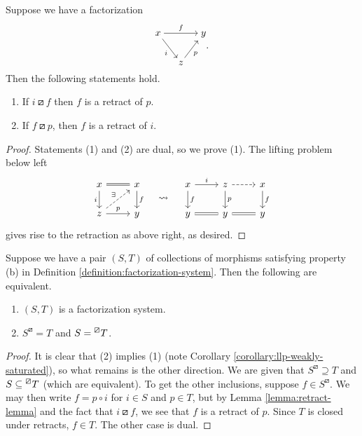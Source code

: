 \begin{lemma}\label{lemma:retract-lemma}
	Suppose we have a factorization
	\[
	\begin{tikzcd}[cramped, column sep=small]
		x\ar[rr,"f"]\ar[dr,"i"'] & & y \\
		& z\ar[ur,"p"'] &
	\end{tikzcd}.
	\]
	Then the following statements hold.
	\begin{enumerate}[label=(\arabic*)]
		\item If \(i\boxslash f\) then \(f\) is a retract of \(p\).
		\item If \(f\boxslash p\), then \(f\) is a retract of \(i\).
	\end{enumerate}
\end{lemma}
\begin{proof}
Statements (1) and (2) are dual, so we prove (1). The lifting problem below left
\[
	\begin{tikzcd}
		x\ar[r,equal]\ar[d,"i"'] & x \ar[d,"f"] \\
		z\ar[r,"p"]\ar[ur,dashed,"\exists"] & y
	\end{tikzcd}\quad\leadsto\quad
	\begin{tikzcd}
		x\ar[d,"f"]\ar[r,"i"] & z\ar[d,"p"]\ar[r,dashed,""] & x \ar[d,"f"] \\
		y \ar[r,equal] & y \ar[r,equal] & y
	\end{tikzcd}
\]
gives rise to the retraction as above right, as desired.
\end{proof}
\begin{proposition}\label{prop:factorization-system-equalities}
	Suppose we have a pair \((S,T)\) of collections of morphisms satisfying property (b) in Definition \ref{definition:factorization-system}. Then the following are equivalent.
	\begin{enumerate}[label=(\arabic*)]
		\item \((S,T)\) is a factorization system.
		\item \(S^\boxslash = T\) and \(S = \prescript{\boxslash}{}{T}\).
	\end{enumerate}
\end{proposition}
\begin{proof}
It is clear that (2) implies (1) (note Corollary \ref{corollary:llp-weakly-saturated}), so what remains is the other direction. We are given that \(S^\boxslash \supseteq T\) and \(S\subseteq \prescript{\boxslash}{}{T}\)
(which are equivalent). To get the other inclusions, suppose \(f\in S^\boxslash\). We may then write \(f = p\circ i\) for \(i\in S\) and \(p\in T\), but by Lemma \ref{lemma:retract-lemma} and the
fact that \(i\boxslash f\), we see that \(f\) is a retract of \(p\). Since \(T\) is closed under retracts, \(f \in T\). The other case is dual.
\end{proof}

